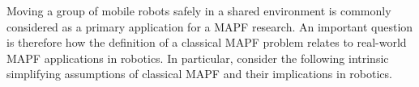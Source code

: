 \documentclass[review]{elsarticle}
\newcommand{\mapf}{\ac{MAPF}\xspace}
\begin{document}

Moving a group of mobile robots safely in a shared environment is commonly considered as a primary application for a \mapf research. An important question is therefore how the definition of a classical \mapf problem relates to real-world \mapf applications in robotics. In particular, consider the following intrinsic simplifying assumptions of classical \mapf and their implications in robotics. 
\end{document}
